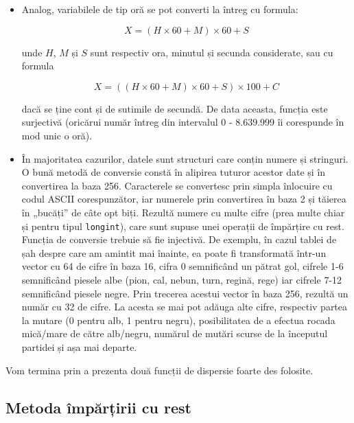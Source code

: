 \begin{itemize}
\item Analog, variabilele de tip oră se pot converti la întreg cu formula:

  \begin{equation}
    X = (H \times 60 + M) \times 60 + S
  \end{equation}

  unde $H$, $M$ și $S$ sunt respectiv ora, minutul și secunda considerate, sau
  cu formula

  \begin{equation}
    X = ((H \times 60 + M) \times 60 + S) \times 100 + C
  \end{equation}

  dacă se ține cont și de sutimile de secundă. De data aceasta, funcția este
  surjectivă (oricărui număr întreg din intervalul 0 - 8.639.999 îi corespunde
  în mod unic o oră).

\item În majoritatea cazurilor, datele sunt structuri care conțin numere și
  stringuri. O bună metodă de conversie constă în alipirea tuturor acestor
  date și în convertirea la baza 256. Caracterele se convertesc prin simpla
  înlocuire cu codul ASCII corespunzător, iar numerele prin convertirea în
  baza 2 și tăierea în „bucăți” de câte opt biți. Rezultă numere cu multe
  cifre (prea multe chiar și pentru tipul {\tt longint}), care sunt supuse
  unei operații de împărțire cu rest. Funcția de conversie trebuie să fie
  injectivă. De exemplu, în cazul tablei de șah despre care am amintit mai
  înainte, ea poate fi transformată într-un vector cu 64 de cifre în baza 16,
  cifra 0 semnificând un pătrat gol, cifrele 1-6 semnificând piesele albe
  (pion, cal, nebun, turn, regină, rege) iar cifrele 7-12 semnificând piesele
  negre. Prin trecerea acestui vector în baza 256, rezultă un număr cu 32 de
  cifre. La acesta se mai pot adăuga alte cifre, respectiv partea la mutare (0
  pentru alb, 1 pentru negru), posibilitatea de a efectua rocada mică/mare de
  către alb/negru, numărul de mutări scurse de la începutul partidei și așa
  mai departe.

\end{itemize}

Vom termina prin a prezenta două funcții de dispersie foarte des folosite.

\subsection{Metoda împărțirii cu rest}


